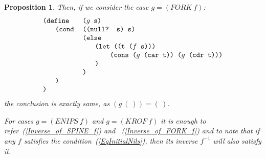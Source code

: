 \documentclass[11pt]{article} %
\newtheorem{propo}{Proposition}
\newcommand{\eqn}[1]{(\ref{#1})}
\newcommand{\eeq}{\end{equation}}
\newcommand{\beql}[1]{\begin{equation}\label{#1}}
\newcommand{\scmcode}[1]{{\tt{#1}}}
\newenvironment{scmdefinefun7}{\begin{tabular}{l l l l l l l}}{\end{tabular}}
\newcommand{\nilatom}{\ensuremath{\mathbf{(~)}}\xspace}
\begin{document}
\begin{propo}
Then, if we consider the case $g = (FORK~f)$:
\beql{QQQ_SchemeCodeFor_g_FORK_f}
\begin{scmdefinefun7}

\multicolumn{2}{l}{\scmcode{(define}} & \multicolumn{2}{l}{\scmcode{($g$ s)}}\\
 & \scmcode{(cond} & \multicolumn{3}{l}{\scmcode{((null? s) s)}}\\
 &                 & \multicolumn{2}{l}{\scmcode{(else}}\\
 &                 & & \multicolumn{2}{l}{\scmcode{(let ((t ($f$ s)))}}\\
 &                 & & & \scmcode{(cons ($g$ (car t)) ($g$ (cdr t)))}\\
 &                 & & \scmcode{)}\\
& & \scmcode{)}\\
& \scmcode{)}\\
\scmcode{)}\\

\end{scmdefinefun7}
\eeq
the conclusion is exactly same, as $(g~\nilatom) = \nilatom$.

For cases $g = (ENIPS~f)$ and $g = (KROF~f)$ it is enough to
refer~\eqn{Inverse_of_SPINE_f} and ~\eqn{Inverse_of_FORK_f}
and to note that if any $f$ satisfies the
condition~\eqn{EqInitialNils}, then its inverse $f^{-1}$ will also
satisfy it.

\end{propo}
\end{document}
